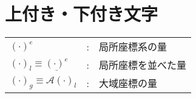 \section*{上付き・下付き文字}
\begin{tabular}{lll}
  \((\cdot)^e\) & : & 局所座標系の量 \\
  \((\cdot)_l \equiv \underline{(\cdot)^e}\) & : & 局所座標を並べた量 \\
  \((\cdot)_g \equiv \mathcal{A} (\cdot)_l\) & : & 大域座標の量 \\
\end{tabular}
